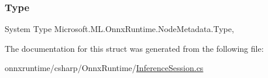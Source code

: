 \subsubsection{\texorpdfstring{Type}{Type}}
{\footnotesize\ttfamily System Type Microsoft.\+M\+L.\+Onnx\+Runtime.\+Node\+Metadata.\+Type\hspace{0.3cm}{\ttfamily [get]}, {\ttfamily [set]}}



The documentation for this struct was generated from the following file\+:\begin{DoxyCompactItemize}
\item 
onnxruntime/csharp/\+Onnx\+Runtime/\mbox{\hyperlink{OnnxRuntime_2InferenceSession_8cs}{Inference\+Session.\+cs}}\end{DoxyCompactItemize}
